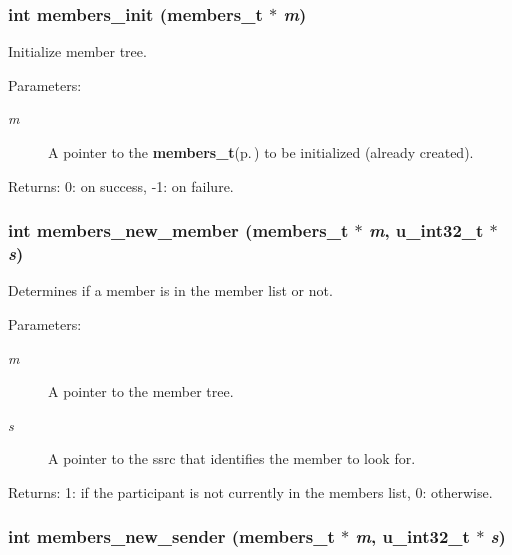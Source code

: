\subsubsection{\setlength{\rightskip}{0pt plus 5cm}int members\_\-init ({\bf members\_\-t} $\ast$ {\em m})}\label{members_8h_a0}


Initialize member tree. \begin{Desc}
\item[Parameters:]
\begin{description}
\item[{\em m}]A pointer to the {\bf members\_\-t}{\rm (p.\,\pageref{structmembers__t})} to be initialized (already created). \end{description}
\end{Desc}
\begin{Desc}
\item[Returns:]0: on success, -1: on failure. \end{Desc}
\subsubsection{\setlength{\rightskip}{0pt plus 5cm}int members\_\-new\_\-member ({\bf members\_\-t} $\ast$ {\em m}, u\_\-int32\_\-t $\ast$ {\em s})}\label{members_8h_a6}


Determines if a member is in the member list or not. \begin{Desc}
\item[Parameters:]
\begin{description}
\item[{\em m}]A pointer to the member tree. \item[{\em s}]A pointer to the ssrc that identifies the member to look for. \end{description}
\end{Desc}
\begin{Desc}
\item[Returns:]1: if the participant is not currently in the members list, 0: otherwise. \end{Desc}
\subsubsection{\setlength{\rightskip}{0pt plus 5cm}int members\_\-new\_\-sender ({\bf members\_\-t} $\ast$ {\em m}, u\_\-int32\_\-t $\ast$ {\em s})}\label{members_8h_a7}


